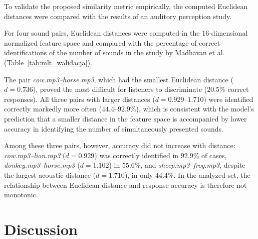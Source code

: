 \documentclass[preprint,12pt]{elsarticle}
\begin{document}
To validate the proposed similarity metric empirically, the computed Euclidean distances were compared with the results of an auditory perception study.

For four sound pairs, Euclidean distances were computed in the 16-dimensional normalized feature space and compared with the percentage of correct identifications of the number of sounds in the study by Madhavan et al.~\cite{MadhavanWrobel2024MLT} (Table~\ref{tab:mlt_walidacja}).

\begin{table}[H]
\centering
{}
\caption{Euclidean distances between pairs of auditory stimuli compared with the percentage of correct responses in the two-item trials of the MLT study~\cite{MadhavanWrobel2024MLT}.}
\label{tab:mlt_walidacja}
\end{table}

The pair \textit{cow.mp3--horse.mp3}, which had the smallest Euclidean distance ($d = 0.736$), proved the most difficult for listeners to discriminate ($20.5\%$ correct responses). All three pairs with larger distances ($d = 0.929$--$1.710$) were identified correctly markedly more often ($44.4$--$92.9\%$), which is consistent with the model's prediction that a smaller distance in the feature space is accompanied by lower accuracy in identifying the number of simultaneously presented sounds.

Among these three pairs, however, accuracy did not increase with distance: \textit{cow.mp3--lion.mp3} ($d = 0.929$) was correctly identified in $92.9\%$ of cases, \textit{donkey.mp3--horse.mp3} ($d = 1.102$) in $55.6\%$, and \textit{sheep.mp3--frog.mp3}, despite the largest acoustic distance ($d = 1.710$), in only $44.4\%$. In the analyzed set, the relationship between Euclidean distance and response accuracy is therefore not monotonic.



\section{Discussion}
\end{document}

